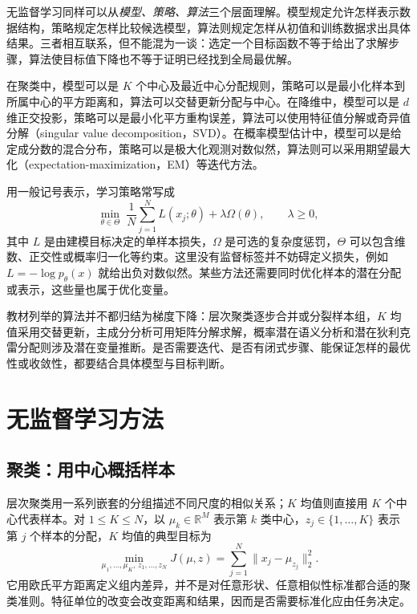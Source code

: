 无监督学习同样可以从\emph{模型、策略、算法}三个层面理解。模型规定允许怎样表示数据结构，策略规定怎样比较候选模型，算法则规定怎样从初值和训练数据求出具体结果。三者相互联系，但不能混为一谈：选定一个目标函数不等于给出了求解步骤，算法使目标值下降也不等于证明已经找到全局最优解。

在聚类中，模型可以是 $K$ 个中心及最近中心分配规则，策略可以是最小化样本到所属中心的平方距离和，算法可以交替更新分配与中心。在降维中，模型可以是 $d$ 维正交投影，策略可以是最小化平方重构误差，算法可以使用特征值分解或奇异值分解（singular value decomposition，SVD）。在概率模型估计中，模型可以是给定成分数的混合分布，策略可以是极大化观测对数似然，算法则可以采用期望最大化（expectation-maximization，EM）等迭代方法。

用一般记号表示，学习策略常写成
\begin{equation}
\min_{\theta\in\Theta}\;
\frac1N\sum_{j=1}^NL(x_j;\theta)+\lambda\Omega(\theta),
\qquad \lambda\geq0,
\label{eq:lh-unsup-general-objective}
\end{equation}
其中 $L$ 是由建模目标决定的单样本损失，$\Omega$ 是可选的复杂度惩罚，$\Theta$ 可以包含维数、正交性或概率归一化等约束。这里没有监督标签并不妨碍定义损失，例如 $L=-\log p_\theta(x)$ 就给出负对数似然。某些方法还需要同时优化样本的潜在分配或表示，这些量也属于优化变量。

教材列举的算法并不都归结为梯度下降：层次聚类逐步合并或分裂样本组，$K$ 均值采用交替更新，主成分分析可用矩阵分解求解，概率潜在语义分析和潜在狄利克雷分配则涉及潜在变量推断。是否需要迭代、是否有闭式步骤、能保证怎样的最优性或收敛性，都要结合具体模型与目标判断。

\section{无监督学习方法}
\label{sec:lh-unsup-methods}

\subsection{聚类：用中心概括样本}
\label{subsec:lh-unsup-kmeans}

层次聚类用一系列嵌套的分组描述不同尺度的相似关系；$K$ 均值则直接用 $K$ 个中心代表样本。对 $1\leq K\leq N$，以 $\mu_k\in\mathbb R^M$ 表示第 $k$ 类中心，$z_j\in\{1,\ldots,K\}$ 表示第 $j$ 个样本的分配，$K$ 均值的典型目标为
\begin{equation}
\min_{\mu_1,\ldots,\mu_K,\,z_1,\ldots,z_N}
J(\mu,z)=\sum_{j=1}^N\|x_j-\mu_{z_j}\|_2^2.
\label{eq:lh-unsup-kmeans-objective}
\end{equation}
它用欧氏平方距离定义组内差异，并不是对任意形状、任意相似性标准都合适的聚类准则。特征单位的改变会改变距离和结果，因而是否需要标准化应由任务决定。

